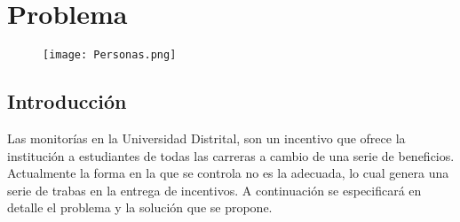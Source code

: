 \chapter{Problema}
\begin{figure}[th!]
	\centering
	\texttt{[image: Personas.png]}
\end{figure}

\section{Introducción}

Las monitorías en la Universidad Distrital, son un incentivo que ofrece la institución a estudiantes de todas
las carreras a cambio de una serie de beneficios. Actualmente la forma en la que se controla no es la adecuada, lo cual genera una serie de trabas en la entrega de incentivos. A continuación se especificará en detalle el problema y la solución que se propone.

\newpage
